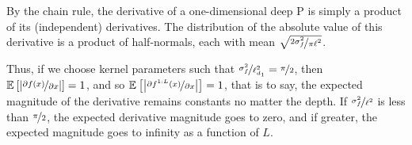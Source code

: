 \documentclass[twoside]{article}
\makeatletter
\newlength{\nonHumbleHeight}
\def\@humbleformat#1{{\settoheight{\nonHumbleHeight}{#1}\resizebox{!}{0.94\nonHumbleHeight}{#1}}}%
\def\humble#1{\@humbleformat{#1}}%
\newcommand{\gp}{{\humble GP}}
\makeatother
\begin{document}
 By the chain rule, the derivative of a one-dimensional deep \gp{} is simply a product of its (independent) derivatives.  
 The distribution of the absolute value of this derivative is a product of half-normals, each with mean $\sqrt{\nicefrac{2 \sigma^2_f}{\pi\ell^2}}$.
%

Thus, if we choose kernel parameters such that $\nicefrac{\sigma^2_f}{\ell_{d_1}^2} = \nicefrac{\pi}{2}$, then $\mathbb{E}_{} \left[ {\left| \nicefrac{\partial f(x)}{\partial x} \right|} \right] = 1$, and so $\mathbb{E}_{} \left[ {\left| \nicefrac{\partial f^{1:L}(x)}{\partial x} \right|} \right] = 1$, that is to say, the expected magnitude of the derivative remains constants no matter the depth.  If $\nicefrac{\sigma^2_f}{\ell^2}$ is less than $\nicefrac{\pi}{2}$, the expected derivative magnitude goes to zero, and if greater, the expected magnitude goes to infinity as a function of $L$.  
\end{document}
